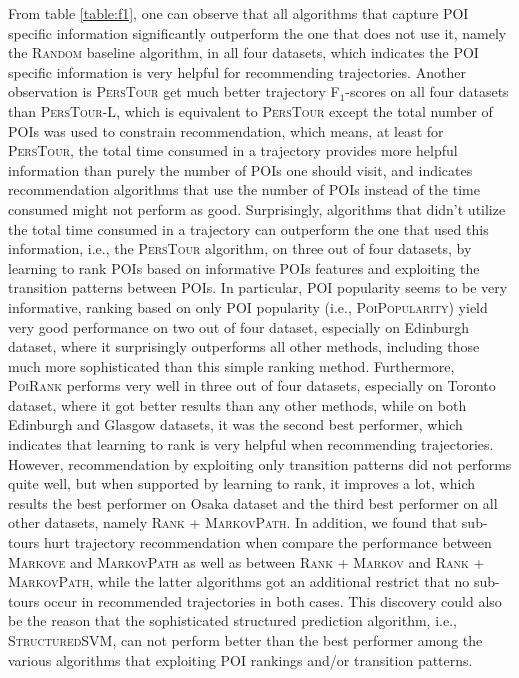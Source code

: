 From table \ref{table:f1}, one can observe that all algorithms that capture POI specific information significantly 
outperform the one that does not use it, namely the \textsc{Random} baseline algorithm, in all four datasets, 
which indicates the POI specific information is very helpful for recommending trajectories.
%
Another observation is \textsc{PersTour} get much better trajectory F$_1$-scores on all four datasets 
than \textsc{PersTour-L}, which is equivalent to \textsc{PersTour} except the total number of POIs was used to 
constrain recommendation, which means, at least for \textsc{PersTour}, the total time consumed in a trajectory
provides more helpful information than purely the number of POIs one should visit, and indicates recommendation
algorithms that use the number of POIs instead of the time consumed might not perform as good.
%
Surprisingly, algorithms that didn't utilize the total time consumed in a trajectory can outperform the one that 
used this information, i.e., the \textsc{PersTour} algorithm, on three out of four datasets, 
by learning to rank POIs based on informative POIs features and exploiting the transition patterns between POIs.
%
In particular, POI popularity seems to be very informative, ranking based on only POI popularity 
(i.e., \textsc{PoiPopularity}) yield very good performance on two out of four dataset, 
especially on Edinburgh dataset, where it surprisingly outperforms all 
other methods, including those much more sophisticated than this simple ranking method.
%
Furthermore, \textsc{PoiRank} performs very well in three out of four datasets, 
especially on Toronto dataset, where it got better results than any other methods, 
while on both Edinburgh and Glasgow datasets, it was the second best performer, 
which indicates that learning to rank is very helpful when recommending trajectories.
%
However, recommendation by exploiting only transition patterns did not performs quite well,
but when supported by learning to rank, it improves a lot, which results the best performer on Osaka dataset and
the third best performer on all other datasets, namely \textsc{Rank} + \textsc{MarkovPath}.
%
In addition, we found that sub-tours hurt trajectory recommendation when compare the performance between
\textsc{Markove} and \textsc{MarkovPath} as well as between \textsc{Rank} + \textsc{Markov} and 
\textsc{Rank} + \textsc{MarkovPath}, while the latter algorithms got an additional restrict that no sub-tours 
occur in recommended trajectories in both cases.
% 
This discovery could also be the reason that the sophisticated structured prediction algorithm, 
i.e., \textsc{StructuredSVM}, can not perform better than the best performer among the various algorithms
that exploiting POI rankings and/or transition patterns.


